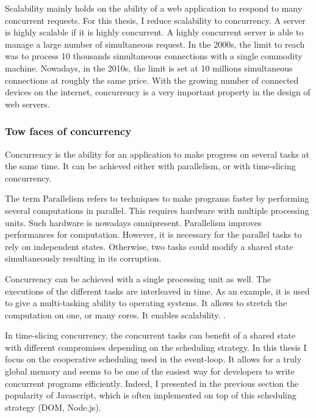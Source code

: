 Scalability mainly holds on the ability of a web application to respond to many concurrent requests.
For this thesis, I reduce scalability to concurrency.
A server is highly scalable if it is highly concurrent.
A highly concurrent server is able to manage a large number of simultaneous request.
In the 2000s, the limit to reach was to process 10 thousands simultaneous connections with a single commodity machine.
Nowadays, in the 2010s, the limit is set at 10 millions simultaneous connections at roughly the same price.
With the growing number of connected devices on the internet, concurrency is a very important property in the design of web servers.

\subsubsection{Tow faces of concurrency}

Concurrency is the ability for an application to make progress on several tasks at the same time.
It can be achieved either with parallelism, or with time-slicing concurrency.

The term Parallelism refers to techniques to make programs faster by performing several computations in parallel. This requires hardware with multiple processing units. Such hardware is nowadays omnipresent.
Parallelism improves performances for computation.
However, it is necessary for the parallel tasks to rely on independent states.
Otherwise, two tasks could modify a shared state simultaneously resulting in its corruption.

Concurrency can be achieved with a single processing unit as well.
The executions of the different tasks are interleaved in time.
As an example, it is used to give a multi-tasking ability to operating systems.
It allows to stretch the computation on one, or many cores.
It enables scalability.
.

In time-slicing concurrency, the concurrent tasks can benefit of a shared state with different compromises depending on the scheduling strategy.
In this thesis I focus on the cooperative scheduling used in the event-loop.
It allows for a truly global memory and seems to be one of the easiest way for developers to write concurrent programs efficiently.
Indeed, I presented in the previous section the popularity of Javascript, which is often implemented on top of this scheduling strategy (DOM, Node.js).

